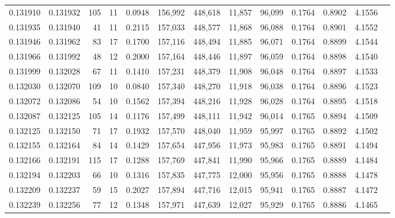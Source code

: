 \begin{tabular}{rrrrrrrrrrrrr}
0.131910 & 0.131932 &   105 &  11 &                                     0.0948 & 156,992 & 448,618 &  11,857 &  96,099 & 0.1764 & 0.8902 & 4.1556 \\
0.131935 & 0.131940 &    41 &  11 &                                     0.2115 & 157,033 & 448,577 &  11,868 &  96,088 & 0.1764 & 0.8901 & 4.1552 \\
0.131946 & 0.131962 &    83 &  17 &                                     0.1700 & 157,116 & 448,494 &  11,885 &  96,071 & 0.1764 & 0.8899 & 4.1544 \\
0.131966 & 0.131992 &    48 &  12 &                                     0.2000 & 157,164 & 448,446 &  11,897 &  96,059 & 0.1764 & 0.8898 & 4.1540 \\
0.131999 & 0.132028 &    67 &  11 &                                     0.1410 & 157,231 & 448,379 &  11,908 &  96,048 & 0.1764 & 0.8897 & 4.1533 \\
0.132030 & 0.132070 &   109 &  10 &                                     0.0840 & 157,340 & 448,270 &  11,918 &  96,038 & 0.1764 & 0.8896 & 4.1523 \\
0.132072 & 0.132086 &    54 &  10 &                                     0.1562 & 157,394 & 448,216 &  11,928 &  96,028 & 0.1764 & 0.8895 & 4.1518 \\
0.132087 & 0.132125 &   105 &  14 &                                     0.1176 & 157,499 & 448,111 &  11,942 &  96,014 & 0.1765 & 0.8894 & 4.1509 \\
0.132125 & 0.132150 &    71 &  17 &                                     0.1932 & 157,570 & 448,040 &  11,959 &  95,997 & 0.1765 & 0.8892 & 4.1502 \\
0.132155 & 0.132164 &    84 &  14 &                                     0.1429 & 157,654 & 447,956 &  11,973 &  95,983 & 0.1765 & 0.8891 & 4.1494 \\
0.132166 & 0.132191 &   115 &  17 &                                     0.1288 & 157,769 & 447,841 &  11,990 &  95,966 & 0.1765 & 0.8889 & 4.1484 \\
0.132194 & 0.132203 &    66 &  10 &                                     0.1316 & 157,835 & 447,775 &  12,000 &  95,956 & 0.1765 & 0.8888 & 4.1478 \\
0.132209 & 0.132237 &    59 &  15 &                                     0.2027 & 157,894 & 447,716 &  12,015 &  95,941 & 0.1765 & 0.8887 & 4.1472 \\
0.132239 & 0.132256 &    77 &  12 &                                     0.1348 & 157,971 & 447,639 &  12,027 &  95,929 & 0.1765 & 0.8886 & 4.1465 \\

\end{tabular}
